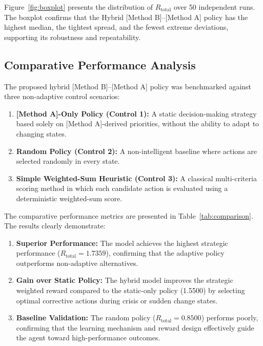 \documentclass[10pt,twocolumn]{article}
\begin{document}
Figure~\ref{fig:boxplot} presents the distribution of
$R_{\mathrm{total}}$ over 50 independent runs. The boxplot confirms
that the Hybrid [Method B]--[Method A] policy has the highest
median, the tightest spread, and the fewest extreme deviations,
supporting its robustness and repeatability.

\subsection{Comparative Performance Analysis}

The proposed hybrid [Method B]--[Method A] policy was benchmarked
against three non-adaptive control scenarios:

\begin{enumerate}
  \item \textbf{[Method A]-Only Policy (Control 1):} A static
        decision-making strategy based solely on [Method A]-derived
        priorities, without the ability to adapt to changing states.
  \item \textbf{Random Policy (Control 2):} A non-intelligent
        baseline where actions are selected randomly in every state.
  \item \textbf{Simple Weighted-Sum Heuristic (Control 3):} A
        classical multi-criteria scoring method in which each
        candidate action is evaluated using a deterministic
        weighted-sum score.
\end{enumerate}

The comparative performance metrics are presented in
Table~\ref{tab:comparison}. The results clearly demonstrate:

\begin{enumerate}
  \item \textbf{Superior Performance:} The model achieves the
        highest strategic performance ($R_{\mathrm{total}} = 1.7359$),
        confirming that the adaptive policy outperforms non-adaptive
        alternatives.
  \item \textbf{Gain over Static Policy:} The hybrid model
        improves the strategic weighted reward compared to the
        static-only policy (1.5500) by selecting optimal corrective
        actions during crisis or sudden change states.
  \item \textbf{Baseline Validation:} The random policy
        ($R_{\mathrm{total}} = 0.8500$) performs poorly, confirming
        that the learning mechanism and reward design effectively
        guide the agent toward high-performance outcomes.
\end{enumerate}
\end{document}
